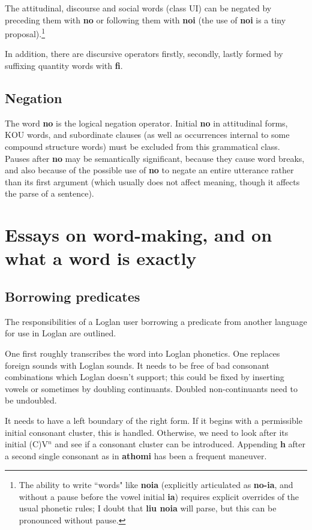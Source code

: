 \documentclass[12pt]{book}
\begin{document}
{The attitudinal, discourse and social words (class UI) can be negated by preceding them with {\bf no} or following them with {\bf noi} (the use of {\bf noi} is a tiny proposal).\footnote{The ability to write ``words" like {\bf noia} (explicitly articulated as {\bf no-ia}, and without a pause before the vowel initial {\bf ia})  requires explicit overrides of the usual phonetic rules; I doubt that {\bf liu noia} will parse, but this can be pronounced without pause.}

In addition, there are discursive operators firstly, secondly, lastly formed by suffixing quantity words with {\bf fi}.

\subsection{Negation}

The word {\bf no} is the logical negation operator.   Initial {\bf no} in attitudinal forms, KOU words, and subordinate clauses (as well as occurrences internal to some compound structure words) must be excluded from this grammatical class.  Pauses after {\bf no} may be semantically significant, because they cause word breaks, and also because of the possible use of {\bf no} to negate an entire utterance rather than its first argument (which usually does not affect meaning, though it affects the parse of a sentence).

\section{Essays on word-making, and on what a word is exactly}

\subsection{Borrowing predicates}

The responsibilities of a Loglan user borrowing a predicate from another language for use in Loglan are outlined.

One first roughly transcribes the word into Loglan phonetics.  One replaces foreign sounds with Loglan sounds.
It needs to be free of bad consonant combinations which Loglan doesn't support; this could be fixed by inserting vowels or sometimes by doubling continuants.   Doubled non-continuants need to be undoubled.

It needs to have a left boundary of the right form.  If it begins with a permissible initial consonant cluster, this is handled.  Otherwise, we need to look after its initial (C)V$^n$ and see if
a consonant cluster can be introduced.  Appending {\bf h} after a  second single consonant as in {\bf athomi} has been a frequent maneuver.

}
\end{document}
